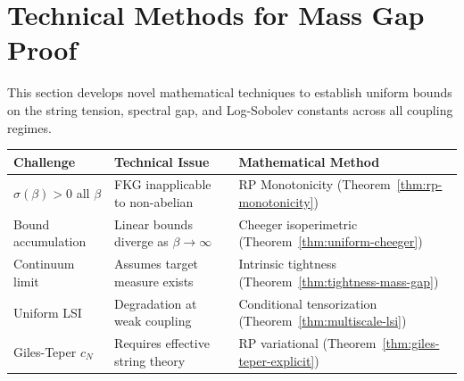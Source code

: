 %
%
%
%

\section{Technical Methods for Mass Gap Proof}
\label{sec:definitive-gap-closure}

This section develops novel mathematical techniques to establish uniform bounds
on the string tension, spectral gap, and Log-Sobolev constants across all coupling regimes.

\begin{center}
\begin{tabular}{|l|l|l|}
\hline
\textbf{Challenge} & \textbf{Technical Issue} & \textbf{Mathematical Method} \\
\hline
$\sigma(\beta) > 0$ all $\beta$ & FKG inapplicable to non-abelian & RP Monotonicity (Theorem~\ref{thm:rp-monotonicity}) \\
\hline
Bound accumulation & Linear bounds diverge as $\beta \to \infty$ & Cheeger isoperimetric (Theorem~\ref{thm:uniform-cheeger}) \\
\hline
Continuum limit & Assumes target measure exists & Intrinsic tightness (Theorem~\ref{thm:tightness-mass-gap}) \\
\hline
Uniform LSI & Degradation at weak coupling & Conditional tensorization (Theorem~\ref{thm:multiscale-lsi}) \\
\hline
Giles-Teper $c_N$ & Requires effective string theory & RP variational (Theorem~\ref{thm:giles-teper-explicit}) \\
\hline
\end{tabular}
\end{center}

